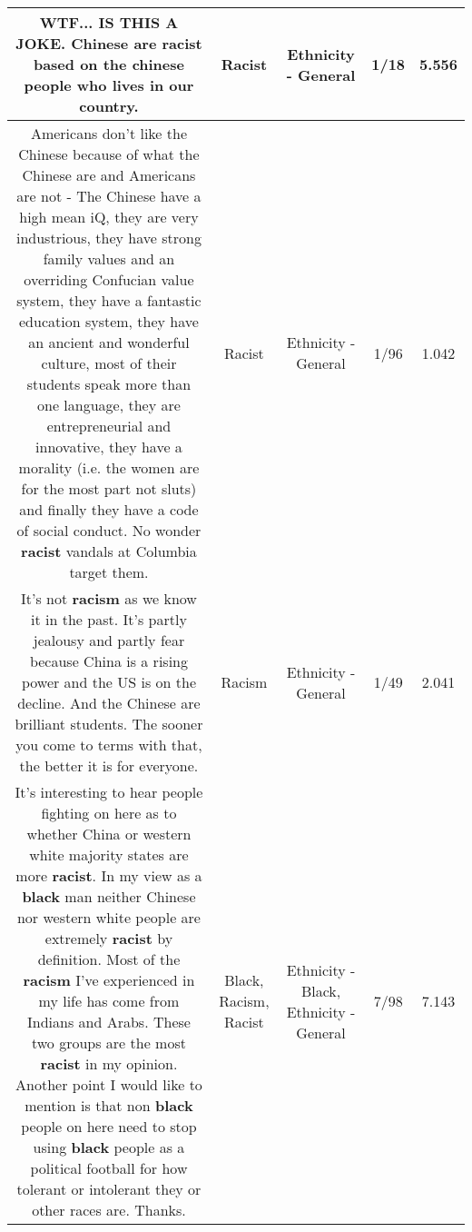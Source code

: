 \documentclass[11pt]{article}
\newlength\mylength
\begin{document}
\begin{center}
\begin{longtable}{|C{.65\mylength}|C{.30\mylength}|C{.12\mylength}|C{.12\mylength}|C{.12\mylength}|}
  \small WTF... IS THIS A JOKE. Chinese are \textbf{racist} based on the chinese people who lives in our country.\normalsize   & Racist & Ethnicity - General & 1/18 & 5.556 \\  \hline
  \small Americans don't like the Chinese because of what the Chinese are and Americans are not - The Chinese have a high mean iQ, they are very industrious, they have strong family values and an overriding Confucian value system, they have a fantastic education system, they have an ancient and wonderful culture, most of their students speak more than one language, they are entrepreneurial and innovative, they have a morality (i.e. the women are for the most part not sluts) and finally they have a code of social conduct. No wonder \textbf{racist} vandals at Columbia target them.\normalsize   & Racist & Ethnicity - General & 1/96 & 1.042 \\  \hline
  \small It's not \textbf{racism} as we know it in the past. It's partly jealousy and partly fear because China is a rising power and the US is on the decline. And the Chinese are brilliant students. The sooner you come to terms with that, the better it is for everyone.\normalsize   & Racism & Ethnicity - General & 1/49 & 2.041 \\  \hline
  \small It's interesting to hear people fighting on here as to whether China or western white majority states are more \textbf{racist}. In my view as a \textbf{black} man neither Chinese nor western white people are extremely \textbf{racist} by definition. Most of the \textbf{racism} I've experienced in my life has come from Indians and Arabs. These two groups are the most \textbf{racist} in my opinion. Another point I would like to mention is that non \textbf{black} people on here need to stop using \textbf{black} people as a political football for how tolerant or intolerant they or other races are. Thanks.\normalsize   & Black, Racism, Racist & Ethnicity - Black, Ethnicity - General & 7/98 & 7.143 \\  \hline

\end{longtable}
\end{center}
\end{document}
